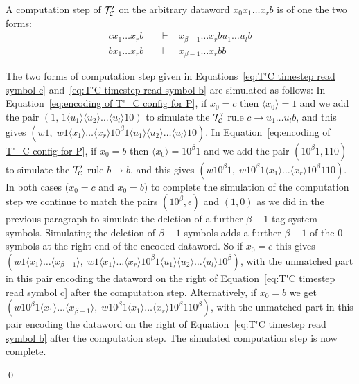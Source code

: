 \documentclass[11pt]{article} \usepackage{amsfonts,amsmath,amssymb,amsthm}
\renewenvironment{proof}{{\bfseries\noindent Proof.}}{\qed\vspace{3.5ex}}
\newcommand{\tne}[1]{\ensuremath{\langle #1\rangle}}
\begin{document}
\begin{proof}
A computation step of $\mathcal{T'_{\mathcal{C}}}$ on the arbitrary dataword $x_0x_1\ldots x_{r}b$ is of one the two forms:
\begin{align}
 cx_1\ldots x_{r}b&\;\;\;\vdash\;\;\; x_{\beta-1}\ldots x_{r}bu_1\ldots u_lb \label{eq:T'C timestep read symbol c}\\
 bx_1\ldots x_{r}b&\;\;\;\vdash\;\;\; x_{\beta-1}\ldots x_{r}bb \label{eq:T'C timestep read symbol b}
\end{align}


The two forms of computation step given in Equations~\eqref{eq:T'C timestep read symbol c} and~\eqref{eq:T'C timestep read symbol b} are simulated as follows: In Equation~\eqref{eq:encoding of T'_C config for P}, if $x_0=c$ then $\tne{x_0}=1$ and we add the pair $(1,\,1\tne{u_1}\tne{u_2}\dots \tne{u_l}10)$ to simulate the $\mathcal{T'_{\mathcal{C}}}$ rule $c\rightarrow u_1\ldots u_lb$,  and this gives $(w1,\;w1\tne{x_1}\ldots\tne{x_{r}}10^{\beta}1\tne{u_1}\tne{u_2}\dots \tne{u_l}10)$.
In Equation~\eqref{eq:encoding of T'_C config for P}, if $x_0=b$ then $\tne{x_0}=10^{\beta}1$ and we add the pair $(10^{\beta}1,110)$ to simulate the $\mathcal{T'_{\mathcal{C}}}$ rule $b\rightarrow b$, and this gives $(w10^{\beta}1,\;w10^{\beta}1\tne{x_1}\ldots\tne{x_{r}}10^{\beta}110)$.
In both cases ($x_0=c$ and $x_0=b$) to complete the simulation of the computation step we continue to match the pairs $(10^{\beta},\epsilon)$ and $(1,0)$ as we did in the previous paragraph to simulate the deletion of a further $\beta-1$ tag system symbols. 
Simulating the deletion of $\beta-1$ symbols adds a further $\beta-1$ of the 0 symbols at the right end of the encoded dataword. 
So if $x_0=c$ this gives $(w1\tne{x_1}\ldots\tne{x_{\beta-1}},\;w1\tne{x_1}\ldots\tne{x_{r}}10^{\beta}1\tne{u_1}\tne{u_2}\dots \tne{u_l}10^{\beta})$, with the unmatched part in this pair encoding the dataword on the right of Equation~\eqref{eq:T'C timestep read symbol c} after the computation step. 
Alternatively, if $x_0=b$ we get $(w10^{\beta}1\tne{x_1}\ldots\tne{x_{\beta-1}},\; w10^{\beta}1\tne{x_1}\ldots\tne{x_{r}}10^{\beta}110^{\beta})$, with the unmatched part in this pair encoding the dataword on the right of Equation~\eqref{eq:T'C timestep read symbol b} after the computation step.
The simulated computation step is now complete.


\end{proof}
\end{document}
